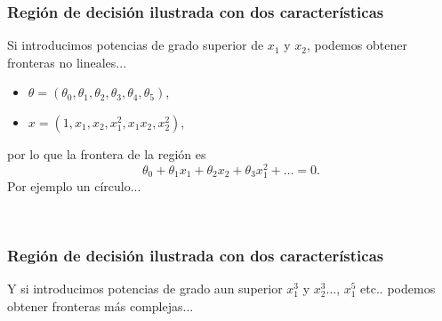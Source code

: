 \documentclass{beamer}
\begin{document}
\begin{frame}\frametitle{Región de decisión ilustrada con dos características}
 \begin{minipage}[t][5cm][t]{5.5cm}
          \end{minipage}
       \begin{minipage}[t][5cm][t]{4.5cm}
         \footnotesize
     Si introducimos potencias de grado superior de  $x_1$ y $x_2$, podemos obtener fronteras no lineales...
     \begin{itemize}
     \item $\theta=(\theta_0,\theta_1,\theta_2,\theta_3,\theta_4,\theta_5)$,
     \item $x=(1,x_1,x_2,x_1^2,x_1x_2, x_2^2)$,
     \end{itemize}
por lo que la frontera de la región es $$\theta_0+\theta_1x_1+\theta_2x_2+\theta_3x_1^2+\ldots=0.$$
Por ejemplo un círculo...
     \end{minipage}\\
\end{frame}
\begin{frame}\frametitle{Región de decisión ilustrada con dos características}
 \begin{minipage}[t][5cm][t]{5.5cm}
          \end{minipage}
       \begin{minipage}[t][5cm][t]{4.5cm}
         \footnotesize
     Y si introducimos potencias de grado aun superior $x_1^3$ y $x_2^3\ldots$, $x_1^5$ etc.. podemos obtener fronteras más complejas...
     \end{minipage}\\       
 \end{frame}
\end{document}

